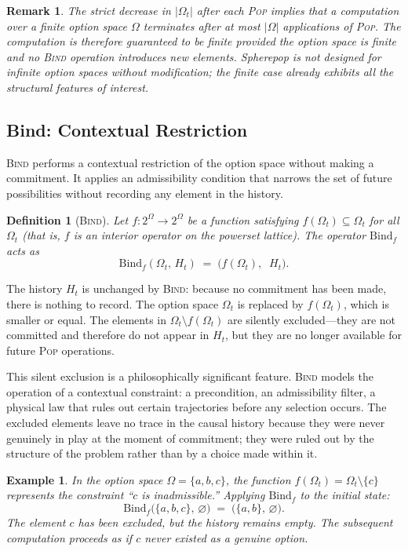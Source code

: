 \documentclass[12pt]{article}
\newtheorem{definition}{Definition}[section]
\newtheorem{remark}{Remark}[section]
\newtheorem{example}{Example}[section]
\begin{document}
\begin{remark}
The strict decrease in $|\Omega_t|$ after each \textsc{Pop} implies that a computation over a finite option space $\Omega$ terminates after at most $|\Omega|$ applications of \textsc{Pop}. The computation is therefore guaranteed to be finite provided the option space is finite and no \textsc{Bind} operation introduces new elements. Spherepop is not designed for infinite option spaces without modification; the finite case already exhibits all the structural features of interest.
\end{remark}

\subsection{Bind: Contextual Restriction}

\textsc{Bind} performs a contextual restriction of the option space without making a commitment. It applies an admissibility condition that narrows the set of future possibilities without recording any element in the history.

\begin{definition}[\textsc{Bind}]
Let $f : 2^\Omega \to 2^\Omega$ be a function satisfying $f(\Omega_t) \subseteq \Omega_t$ for all $\Omega_t$ (that is, $f$ is an interior operator on the powerset lattice). The operator $\mathrm{Bind}_f$ acts as
\[
\mathrm{Bind}_f(\Omega_t,\, H_t) \;=\; \bigl(f(\Omega_t),\;\; H_t\bigr).
\]
\end{definition}

The history $H_t$ is unchanged by \textsc{Bind}: because no commitment has been made, there is nothing to record. The option space $\Omega_t$ is replaced by $f(\Omega_t)$, which is smaller or equal. The elements in $\Omega_t \setminus f(\Omega_t)$ are silently excluded---they are not committed and therefore do not appear in $H_t$, but they are no longer available for future \textsc{Pop} operations.

This silent exclusion is a philosophically significant feature. \textsc{Bind} models the operation of a contextual constraint: a precondition, an admissibility filter, a physical law that rules out certain trajectories before any selection occurs. The excluded elements leave no trace in the causal history because they were never genuinely in play at the moment of commitment; they were ruled out by the structure of the problem rather than by a choice made within it.

\begin{example}
\label{ex:bind}
In the option space $\Omega = \{a, b, c\}$, the function $f(\Omega_t) = \Omega_t \setminus \{c\}$ represents the constraint ``$c$ is inadmissible.'' Applying $\mathrm{Bind}_f$ to the initial state:
\[
\mathrm{Bind}_f\bigl(\{a,b,c\},\, \varnothing\bigr) \;=\; \bigl(\{a,b\},\, \varnothing\bigr).
\]
The element $c$ has been excluded, but the history remains empty. The subsequent computation proceeds as if $c$ never existed as a genuine option.
\end{example}
\end{document}
